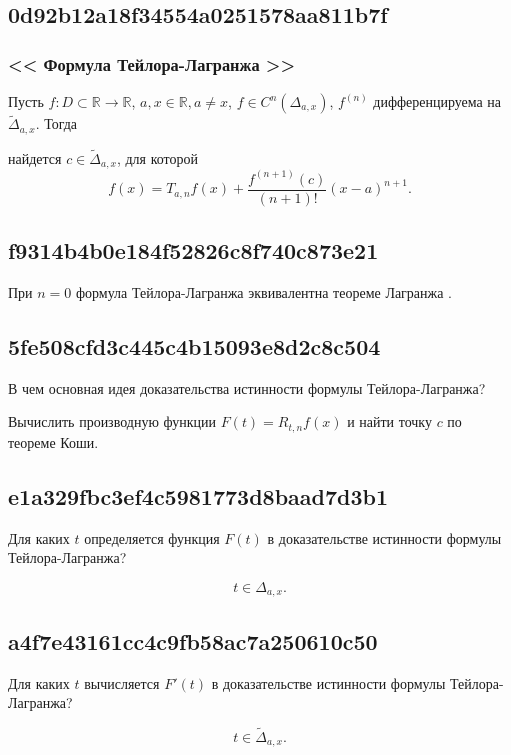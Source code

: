 \documentclass[11pt, a5paper]{article}
\newenvironment{note}[1]{\goodbreak\par\subsection{\hfill \color{lightgray}\tiny #1}}{}
\newenvironment{cloze}[2][\ldots]{\begin{leftbar}}{\end{leftbar}}
\newenvironment{icloze}[2][\ldots]{%
  \ignorespaces\text{\tiny \color{lightgray}\{#2} %
}{%
  \text{\tiny\color{lightgray}\}}\unskip%
}
\begin{document}
\begin{note}{0d92b12a18f34554a0251578aa811b7f}
    \subsubsection{<<\begin{icloze}{3}Формула Тейлора-Лагранжа\end{icloze}>>}

    Пусть \( f : D \subset \mathbb R \to \mathbb R \), \quad \( a, x \in \mathbb R, a \neq x \), \quad \begin{icloze}{2}\( f \in C^{n} (\Delta _{a, x} ) \), \( f^{(n)} \) дифференцируема на \( \widetilde \Delta _{a, x}  \).\end{icloze} Тогда
    \begin{icloze}{1}
        найдется \( c \in \widetilde \Delta _{a, x}  \), для которой
        \[
            f(x) = T_{a, n} f (x) + \frac{f^{(n + 1)} (c)}{(n + 1)! }  (x - a)^{n + 1}.
        \]
    \end{icloze}
\end{note}

\begin{note}{f9314b4b0e184f52826c8f740c873e21}
    При \( n = 0 \) формула Тейлора-Лагранжа эквивалентна \begin{icloze}{1}теореме Лагранжа\end{icloze}.
\end{note}

\begin{note}{5fe508cfd3c445c4b15093e8d2c8c504}
    В чем основная идея доказательства истинности формулы Тейлора-Лагранжа?

    \begin{cloze}{1}
        Вычислить производную функции \( F(t) = R_{t, n} f(x) \) и найти точку \( c \) по теореме Коши.
    \end{cloze}
\end{note}

\begin{note}{e1a329fbc3ef4c5981773d8baad7d3b1}
    Для каких \( t \) определяется функция \( F(t) \) в доказательстве истинности формулы Тейлора-Лагранжа?

    \begin{cloze}{1}
        \[
            t \in \Delta _{a, x}.
        \]
    \end{cloze}
\end{note}

\begin{note}{a4f7e43161cc4c9fb58ac7a250610c50}
    Для каких \( t \) вычисляется \( F'(t) \) в доказательстве истинности формулы Тейлора-Лагранжа?

    \begin{cloze}{1}
        \[
            t \in \widetilde \Delta _{a, x}.
        \]
    \end{cloze}
\end{note}
\end{document}
